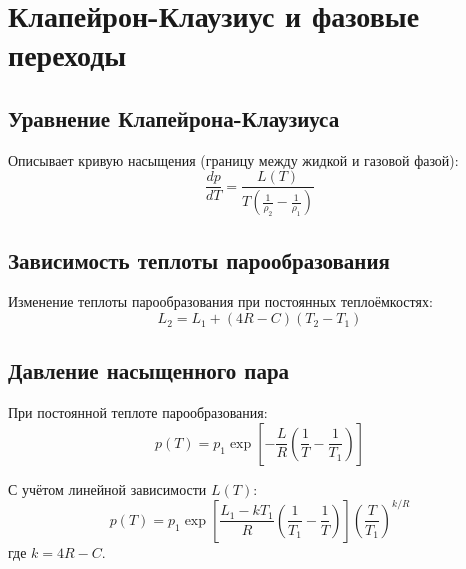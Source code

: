 \documentclass{article}
\begin{document}
\section*{Клапейрон-Клаузиус и фазовые переходы}

\subsection*{Уравнение Клапейрона-Клаузиуса}
Описывает кривую насыщения (границу между жидкой и газовой фазой):
\[
\frac{dp}{dT}=\frac{L(T)}{T\left(\frac{1}{\rho_2}-\frac{1}{\rho_1}\right)}
\]

\subsection*{Зависимость теплоты парообразования}
Изменение теплоты парообразования при постоянных теплоёмкостях:
\[
L_2 = L_1 + (4R - C)(T_2-T_1)
\]

\subsection*{Давление насыщенного пара}
При постоянной теплоте парообразования:
\[
p(T)=p_1\exp\!\left[-\frac{L}{R}\left(\frac{1}{T}-\frac{1}{T_1}\right)\right]
\]

С учётом линейной зависимости $L(T)$:
\[
p(T)=p_1\exp\!\left[\frac{L_1 - k T_1}{R}\left(\frac{1}{T_1}-\frac{1}{T}\right)\right]
\left(\frac{T}{T_1}\right)^{k/R}
\]
где $k=4R-C$.
\end{document}
